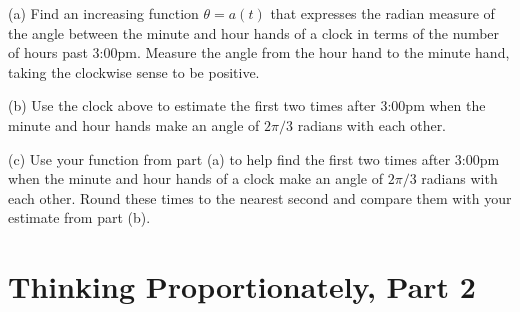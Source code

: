 \documentclass{ximera}
\begin{document}
\begin{question}   \label{Q54B: Angles}
(a) Find an increasing function $\theta = a(t)$ that expresses the radian measure of the angle between the minute and hour hands of a clock in terms of the number of hours past 3:00pm. Measure the angle from the hour hand to the minute hand, taking the clockwise sense to be positive. %

(b) Use the clock above to estimate the first two times after 3:00pm when the minute and hour hands make an angle of $2\pi/3$ radians with each other.

(c) Use your function from part (a) to help find the first two times after 3:00pm when the minute and hour hands of a clock make an angle of $2\pi/3$ radians with each other. Round these times to the nearest second and compare them with your estimate from part (b).

\end{question}






\section{Thinking Proportionately, Part 2}
\end{document}
